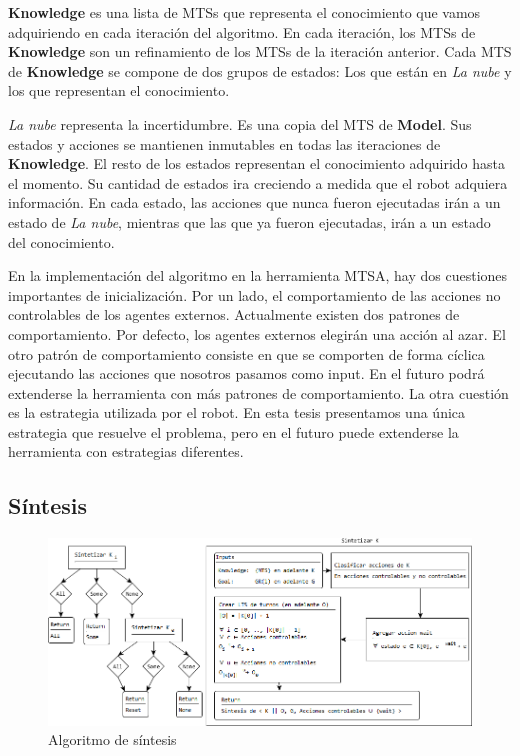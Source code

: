 \textbf{Knowledge} es una lista de MTSs que representa el conocimiento que vamos adquiriendo en cada iteración del algoritmo. En cada iteración, los MTSs
de \textbf{Knowledge} son un refinamiento de los MTSs de la iteración anterior. Cada MTS de \textbf{Knowledge} se compone de dos grupos de estados: Los
que están en \textit{La nube} y los que representan el conocimiento.

\vspace{\baselineskip}
\textit{La nube} representa la incertidumbre. Es una copia del MTS de \textbf{Model}. Sus estados y acciones se mantienen inmutables en todas las 
iteraciones de \textbf{Knowledge}.
El resto de los estados representan el conocimiento adquirido hasta el momento. Su cantidad de estados ira creciendo a medida que el robot adquiera información.
En cada estado, las acciones que nunca fueron ejecutadas irán a un estado de \textit{La nube}, mientras que las que ya fueron ejecutadas, irán a un estado del
conocimiento.

\vspace{\baselineskip}
En la implementación del algoritmo en la herramienta MTSA, hay dos cuestiones importantes de inicialización.
Por un lado, el comportamiento de las acciones no controlables de los agentes externos. Actualmente existen dos patrones de comportamiento.
Por defecto, los agentes externos elegirán una acción al azar. El otro patrón de comportamiento consiste en que se comporten de forma cíclica ejecutando
las acciones que nosotros pasamos como input. En el futuro podrá extenderse la herramienta con más patrones de comportamiento.
La otra cuestión es la estrategia utilizada por el robot. En esta tesis presentamos una única estrategia que resuelve el problema, pero en el futuro puede
extenderse la herramienta con estrategias diferentes.

\subsection{Síntesis}

\begin{figure}[H]
  \centering
    \includegraphics[width=1.0\textwidth]{Imagenes/Algoritmo/Algoritmo_sintetizar.png}
  \caption{Algoritmo de síntesis}
  \label{fig:Algoritmo_sintetizar}
\end{figure}

